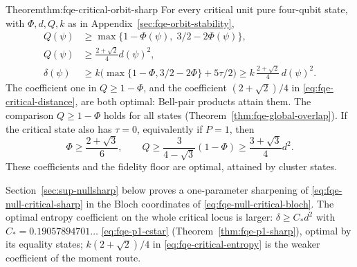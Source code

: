 \begin{restated}{Theorem}{thm:fqe-critical-orbit-sharp}
For every critical unit pure four-qubit state, with $\Phi,d,Q,k$
as in Appendix~\ref{sec:fqe-orbit-stability},
\begin{align*}
 Q(\psi)&\ge\max\{1-\Phi(\psi),\;3/2-2\Phi(\psi)\},\\
 Q(\psi)&\ge\frac{2+\sqrt2}{4}d(\psi)^2,\\
 \delta(\psi)&\ge k\bigl(\max\{1-\Phi,3/2-2\Phi\}+5\tau/2\bigr)
       \ge k\,\frac{2+\sqrt2}{4}\,d(\psi)^2.
\end{align*}
The coefficient one in $Q\ge1-\Phi$, and the coefficient
$(2+\sqrt2)/4$ in \eqref{eq:fqe-critical-distance}, are both optimal:
Bell-pair products attain them. The comparison $Q\ge1-\Phi$ holds for all states
(Theorem~\ref{thm:fqe-global-overlap}).
If the critical state also has $\tau=0$, equivalently if $P=1$, then
\begin{equation*}
 \Phi\ge\frac{2+\sqrt3}{6},\qquad
 Q\ge\frac3{4-\sqrt3}(1-\Phi)\ge\frac{3+\sqrt3}{4}d^2.
\end{equation*}
These coefficients and the fidelity floor are optimal, attained by cluster states.
\end{restated}
Section~\ref{sec:sup-nullsharp} below proves a one-parameter sharpening of
\eqref{eq:fqe-null-critical-sharp} in the Bloch coordinates of \eqref{eq:fqe-null-critical-bloch}. The optimal entropy
coefficient on the whole critical locus is larger: $\delta\ge C_*d^2$ with $C_*=0.19057894701\ldots$ \eqref{eq:fqe-p1-cstar}
(Theorem~\ref{thm:fqe-p1-sharp}), optimal by its equality states; $k(2+\sqrt2)/4$ in \eqref{eq:fqe-critical-entropy}
is the weaker coefficient of the moment route.



